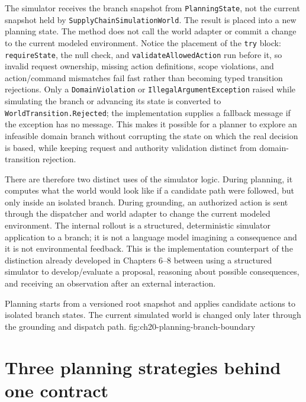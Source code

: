 The simulator receives the branch snapshot from \texttt{PlanningState}, not the current snapshot held by \texttt{SupplyChainSimulationWorld}. The result is placed into a new planning state. The method does not call the world adapter or commit a change to the current modeled environment. Notice the placement of the \texttt{try} block: \texttt{requireState}, the null check, and \texttt{validateAllowedAction} run before it, so invalid request ownership, missing action definitions, scope violations, and action/command mismatches fail fast rather than becoming typed transition rejections. Only a \texttt{DomainViolation} or \texttt{IllegalArgumentException} raised while simulating the branch or advancing its state is converted to \texttt{WorldTransition.Rejected}; the implementation supplies a fallback message if the exception has no message. This makes it possible for a planner to explore an infeasible domain branch without corrupting the state on which the real decision is based, while keeping request and authority validation distinct from domain-transition rejection.

There are therefore two distinct uses of the simulator logic. During planning, it computes what the world would look like if a candidate path were followed, but only inside an isolated branch. During grounding, an authorized action is sent through the dispatcher and world adapter to change the current modeled environment. The internal rollout is a structured, deterministic simulator application to a branch; it is not a language model imagining a consequence and it is not environmental feedback. This is the implementation counterpart of the distinction already developed in Chapters 6--8 between using a structured simulator to develop/evaluate a proposal, reasoning about possible consequences, and receiving an observation after an external interaction.

  {Planning starts from a versioned root snapshot and applies candidate actions to isolated branch states. The current simulated world is changed only later through the grounding and dispatch path.}
  {fig:ch20-planning-branch-boundary}

\section{Three planning strategies behind one contract}
\label{sec:ch20-planner-strategies}

